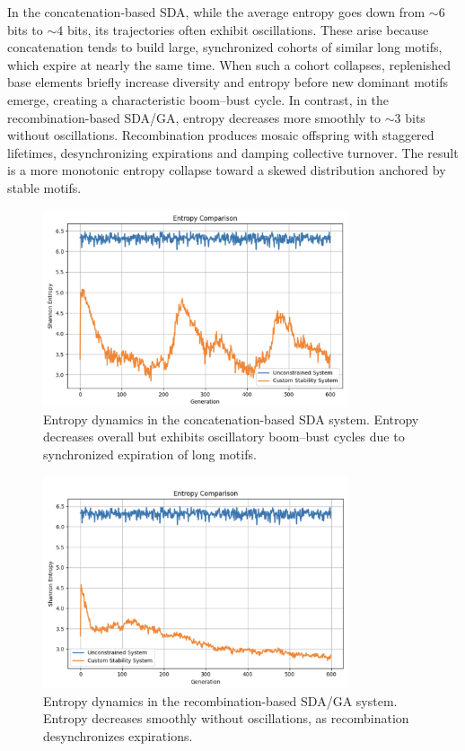\documentclass[life,article,submit,pdftex,moreauthors]{Definitions/mdpi}
\begin{document}
In the concatenation-based SDA, while the average entropy goes down from $\sim6$ bits to $\sim4$ bits, its trajectories often exhibit oscillations. These arise because concatenation tends to build large, synchronized cohorts of similar long motifs, which expire at nearly the same time. When such a cohort collapses, replenished base elements briefly increase diversity and entropy before new dominant motifs emerge, creating a characteristic boom–bust cycle. In contrast, in the recombination-based SDA/GA, entropy decreases more smoothly to $\sim3$ bits without oscillations. Recombination produces mosaic offspring with staggered lifetimes, desynchronizing expirations and damping collective turnover. The result is a more monotonic entropy collapse toward a skewed distribution anchored by stable motifs.

\begin{figure}[H]
    \centering
    \includegraphics[width=0.8\textwidth]{SDA-concat-entropy.png}
    \caption{Entropy dynamics in the concatenation-based SDA system. Entropy decreases overall but exhibits oscillatory boom–bust cycles due to synchronized expiration of long motifs.}
    \label{fig:concat-entropy}
\end{figure}

\begin{figure}[H]
    \centering
    \includegraphics[width=0.8\textwidth]{SDA-GA-entropy.png}
    \caption{Entropy dynamics in the recombination-based SDA/GA system. Entropy decreases smoothly without oscillations, as recombination desynchronizes expirations.}
    \label{fig:ga-entropy}
\end{figure}
\end{document}

